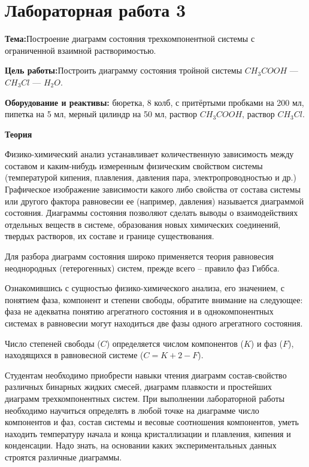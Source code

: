 \section{Лабораторная работа 3 }
\textbf{Тема:}Построение диаграмм состояния трехкомпонентной системы с ограниченной взаимной растворимостью.

\textbf{Цель работы:}Построить диаграмму состояния тройной системы $CH_{3}COOH$ --- $CH_{3}Cl$ --- $H_{2}O$.

\textbf{Оборудование и реактивы:} бюретка, 8 колб, с притёртыми пробками на 200 мл, пипетка на 5 мл, мерный цилиндр на 50 мл, раствор $CH_{3}COOH$, раствор $CH_{3}Cl$.

\textbf{Теория}

Физико-химический анализ  устанавливает  количественную зависимость между составом и каким-нибудь измеренным физическим свойством  системы (температурой кипения,  плавления,  давления пара, электропроводностью и др.) Графическое изображение зависимости какого либо свойства от состава системы или другого фактора равновесии ее (например, давления) называется диаграммой состояния. Диаграммы состояния позволяют сделать выводы о взаимодействиях отдельных веществ в системе,  образования новых  химических  соединений, твердых растворов, их составе и границе существования.

Для разбора диаграмм состояния широко применяется теория равновесия  неоднородных (гетерогенных) систем,  прежде всего -- правило фаз Гиббса.

Ознакомившись с сущностью физико-химического анализа,  его значением,  с понятием фаза,  компонент и степени свободы,  обратите внимание на следующее: фаза не адекватна понятию агрегатного состояния и в однокомпонентных системах в равновесии могут находиться две фазы одного агрегатного состояния.

Число степеней свободы ($C$) определяется числом компонентов ($K$) и фаз ($F$), находящихся  в  равновесной  системе ($C=K+2-F$).

Студентам необходимо  приобрести  навыки  чтения  диаграмм состав-свойство различных бинарных жидких смесей,  диаграмм плавкости и простейших диаграмм трехкомпонентных систем. При выполнении лабораторной работы необходимо научиться определять в любой точке на диаграмме число компонентов и фаз,  состав системы и весовые соотношения компонентов,  уметь находить температуру  начала  и  конца кристаллизации и плавления,  кипения и конденсации. Надо знать, на основании каких экспериментальных данных строятся различные  диаграммы.

